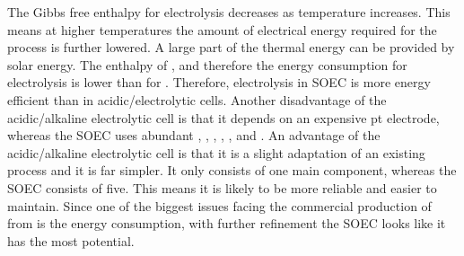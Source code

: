 The Gibbs free enthalpy for  electrolysis decreases as temperature increases.
This means at higher temperatures the amount of electrical energy required for the process is further lowered.
A large part of the thermal energy can be provided by solar energy.
The enthalpy of , and therefore the energy consumption for  electrolysis is lower than for .
Therefore,  electrolysis in SOEC is more energy efficient than in acidic/electrolytic cells.
Another disadvantage of the acidic/alkaline electrolytic cell is that it depends on an expensive pt electrode, whereas the SOEC uses abundant , , , , ,  and .
An advantage of the acidic/alkaline electrolytic cell is that it is a slight adaptation of an existing process and it is far simpler.
It only consists of one main component, whereas the SOEC consists of five.
This means it is likely to be more reliable and easier to maintain.
Since one of the biggest issues facing the commercial production of  from  is the energy consumption, with further refinement the SOEC looks like it has the most potential.


